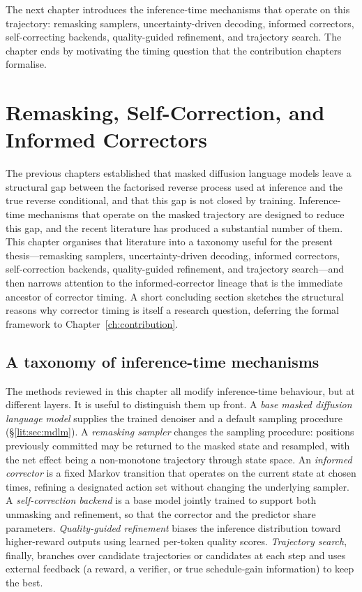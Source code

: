 The next chapter introduces the inference-time mechanisms that operate on
this trajectory: remasking samplers, uncertainty-driven decoding, informed
correctors, self-correcting backends, quality-guided refinement, and
trajectory search. The chapter ends by motivating the timing question that
the contribution chapters formalise.



\chapter{Remasking, Self-Correction, and Informed Correctors}
\label{lit:ch:correctors}

The previous chapters established that masked diffusion language models
leave a structural gap between the factorised reverse process used at
inference and the true reverse conditional, and that this gap is not closed
by training. Inference-time mechanisms that operate on the masked
trajectory are designed to reduce this gap, and the recent literature has
produced a substantial number of them. This chapter organises that
literature into a taxonomy useful for the present thesis---remasking
samplers, uncertainty-driven decoding, informed correctors, self-correction
backends, quality-guided refinement, and trajectory search---and then
narrows attention to the informed-corrector lineage that is the immediate
ancestor of corrector timing. A short concluding section sketches the
structural reasons why corrector timing is itself a research question,
deferring the formal framework to Chapter~\ref{ch:contribution}.

\section{A taxonomy of inference-time mechanisms}
\label{lit:sec:taxonomy}

The methods reviewed in this chapter all modify inference-time behaviour,
but at different layers. It is useful to distinguish them up front. A
\emph{base masked diffusion language model} supplies the trained denoiser
and a default sampling procedure (\S\ref{lit:sec:mdlm}). A \emph{remasking
sampler} changes the sampling procedure: positions previously committed
may be returned to the masked state and resampled, with the net effect
being a non-monotone trajectory through state space. An \emph{informed
corrector} is a fixed Markov transition that operates on the current state
at chosen times, refining a designated action set without changing the
underlying sampler. A \emph{self-correction backend} is a base model
jointly trained to support both unmasking and refinement, so that the
corrector and the predictor share parameters. \emph{Quality-guided
refinement} biases the inference distribution toward higher-reward outputs
using learned per-token quality scores. \emph{Trajectory search}, finally,
branches over candidate trajectories or candidates at each step and uses
external feedback (a reward, a verifier, or true schedule-gain information)
to keep the best.

